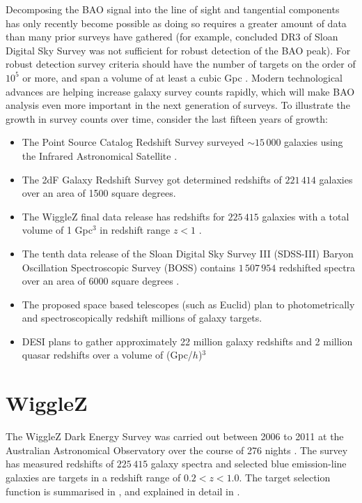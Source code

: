 \documentclass[titlesmallcaps, examinerscopy, copyrightpage]{uqthesis}
\begin{document}
Decomposing the BAO signal into the line of sight and tangential components has only recently become possible as doing so requires a greater amount of data than many prior surveys have gathered (for example, \citet{OkumuraMatsubara2008} concluded DR3 of Sloan Digital Sky Survey was not sufficient for robust detection of the BAO peak). For robust detection survey criteria should have the number of targets on the order of $10^5$ or more, and span a volume of at least a cubic Gpc \citep{Tegmark1997,BlakeGlazebrook2003,BlakeParkinson2006}. Modern technological advances are helping increase galaxy survey counts rapidly, which will make BAO analysis even more important in the next generation of surveys. To illustrate the growth in survey counts over time, consider the last fifteen years of growth:
\begin{itemize}
\item The Point Source Catalog Redshift Survey surveyed $\sim 15\,000$ galaxies using the Infrared Astronomical Satellite \citep{SaundersSutherland2000}.
\item The 2dF Galaxy Redshift Survey got determined redshifts of $221\,414$ galaxies \citep{CollessPeterson2003} over an area of 1500 square degrees.
\item The WiggleZ final data release has redshifts for $225\,415$ galaxies with a total volume of 1 Gpc$^3$ in redshift range $z < 1$ \citep{Drinkwater2010, Parkinson2012}.
\item The tenth data release of the Sloan Digital Sky Survey III (SDSS-III) Baryon Oscillation Spectroscopic Survey (BOSS) contains $1\,507\,954$ redshifted spectra over an area of 6000 square degrees \citep{AhnAlexandroff2014}.
\item The proposed space based telescopes (such as Euclid) plan to photometrically and spectroscopically redshift millions of galaxy targets\citep{CimattiRobberto2009,WangPercival2010}.
\item DESI plans to gather approximately 22 million galaxy redshifts and 2 million quasar redshifts over a volume of (Gpc/$h$)$^3$ \citep{LeviBebek2013}
\end{itemize}






\section{WiggleZ} \label{sec:wigglez}

The WiggleZ Dark Energy Survey was carried out between 2006 to 2011 at the Australian Astronomical Observatory over the course of 276 nights \citep{Drinkwater2010}. The survey has measured redshifts of $225\,415$ galaxy spectra and selected blue emission-line galaxies are targets in a redshift range of $0.2 < z < 1.0$. The target selection function is summarised in \citet{BlakeDavis2011}, and explained in detail in \citet{BlakeBrough2010}. 
\end{document}

